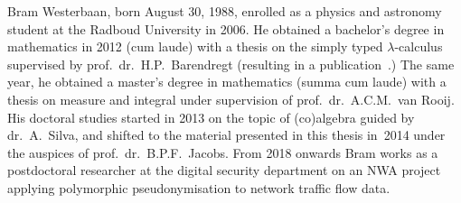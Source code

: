 \documentclass[b5paper]{book}
\begin{document}
Bram Westerbaan, born August 30, 1988,
enrolled as a physics and astronomy student at 
the Radboud University in 2006.
He obtained a bachelor's degree in mathematics in 2012 (cum laude)
with a thesis
on the simply typed $\lambda$-calculus
supervised by prof.~dr.~H.P.~Barendregt
(resulting in a publication~\cite{brambachelor}.)
The same year,
he obtained a master's degree in mathematics (summa cum laude)
with a thesis\cite{brammaster} on measure and integral
under supervision of prof.~dr.~A.C.M.~van Rooij.
His doctoral studies started in 2013
on the topic of (co)algebra guided by dr.~A.~Silva,
and shifted 
to the material presented in this thesis
in~2014
under the auspices of prof.~dr.~B.P.F.~Jacobs.
From 2018 onwards Bram works as a postdoctoral researcher
at the digital security department on
an NWA project applying polymorphic pseudonymisation
to network traffic flow data.
\end{document}
